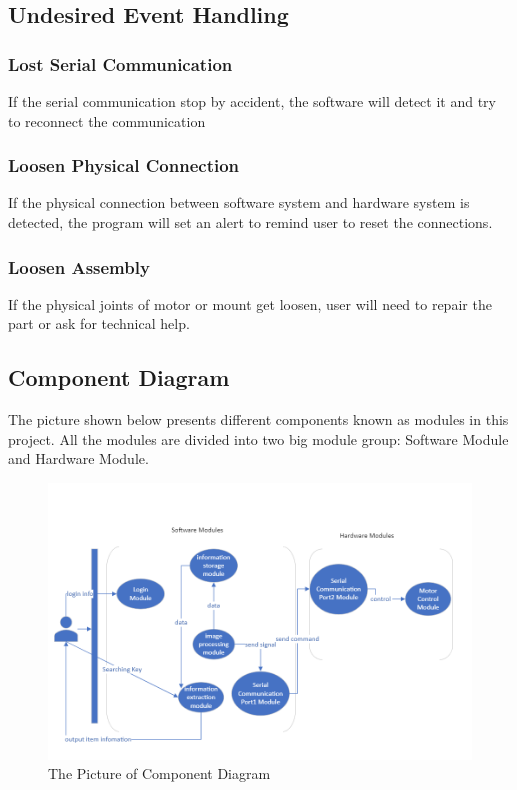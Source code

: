 \documentclass[12pt, titlepage]{article}
\begin{document}
\subsection{Undesired Event Handling}


\subsubsection{Lost Serial Communication}
If the serial communication stop by accident, the software will detect it and try to reconnect the communication

\subsubsection{Loosen Physical Connection}
If the physical connection between software system and hardware system is detected, the program will set an alert to remind user to reset the connections.

\subsubsection{Loosen Assembly}
If the physical joints of motor or mount get loosen, user will need to repair the part or ask for technical help.

\subsection{Component Diagram}
The picture shown below presents different components known as modules in this project. All the modules are divided into two big module group: Software Module and Hardware Module. 

\begin{figure}[H]
    \centering
    \includegraphics[width=1\textwidth]{Module.png}
    \caption{The Picture of Component Diagram}
\end{figure}
\end{document}
